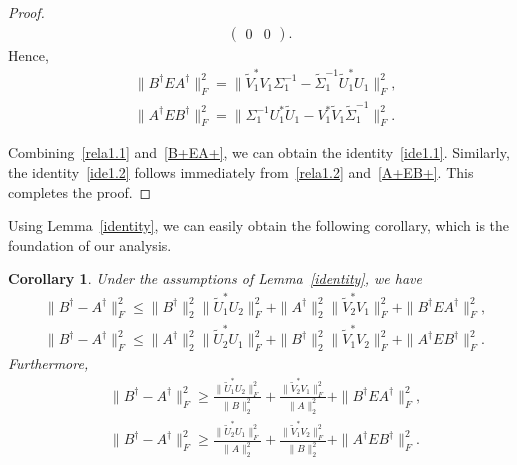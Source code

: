 \documentclass[11pt]{article}
\newtheorem{corollary}{Corollary}[section]
\begin{document}
\begin{proof}
\begin{align*}
\begin{pmatrix}
0 & 0
\end{pmatrix}.
\end{align*}
Hence,
\begin{subequations}
\begin{align}
&\|B^{\dagger}EA^{\dagger}\|_{F}^{2}=\|\widetilde{V}_{1}^{\ast}V_{1}\Sigma_{1}^{-1}-\widetilde{\Sigma}_{1}^{-1}\widetilde{U}_{1}^{\ast}U_{1}\|_{F}^{2},\label{B+EA+}\\
&\|A^{\dagger}EB^{\dagger}\|_{F}^{2}=\|\Sigma_{1}^{-1}U_{1}^{\ast}\widetilde{U}_{1}-V_{1}^{\ast}\widetilde{V}_{1}\widetilde{\Sigma}_{1}^{-1}\|_{F}^{2}.\label{A+EB+}
\end{align}
\end{subequations}

Combining~\eqref{rela1.1} and~\eqref{B+EA+}, we can obtain the identity~\eqref{ide1.1}. Similarly, the identity~\eqref{ide1.2} follows immediately from~\eqref{rela1.2} and~\eqref{A+EB+}. This completes the proof.
\end{proof}

Using Lemma~\ref{identity}, we can easily obtain the following corollary, which is the foundation of our analysis.

\begin{corollary}
Under the assumptions of Lemma~\ref{identity}, we have
\begin{subequations}
\begin{align}
&\|B^{\dagger}-A^{\dagger}\|_{F}^{2}\leq\|B^{\dagger}\|_{2}^{2}\|\widetilde{U}_{1}^{\ast}U_{2}\|_{F}^{2}+\|A^{\dagger}\|_{2}^{2}\|\widetilde{V}_{2}^{\ast}V_{1}\|_{F}^{2}+\|B^{\dagger}EA^{\dagger}\|_{F}^{2},\label{upE+1.1}\\
&\|B^{\dagger}-A^{\dagger}\|_{F}^{2}\leq\|A^{\dagger}\|_{2}^{2}\|\widetilde{U}_{2}^{\ast}U_{1}\|_{F}^{2}+\|B^{\dagger}\|_{2}^{2}\|\widetilde{V}_{1}^{\ast}V_{2}\|_{F}^{2}+\|A^{\dagger}EB^{\dagger}\|_{F}^{2}.\label{upE+1.2}
\end{align}
\end{subequations}
Furthermore,
\begin{subequations}
\begin{align}
&\|B^{\dagger}-A^{\dagger}\|_{F}^{2}\geq\frac{\|\widetilde{U}_{1}^{\ast}U_{2}\|_{F}^{2}}{\|B\|_{2}^{2}}+\frac{\|\widetilde{V}_{2}^{\ast}V_{1}\|_{F}^{2}}{\|A\|_{2}^{2}}+\|B^{\dagger}EA^{\dagger}\|_{F}^{2},\label{lowE+1.1}\\
&\|B^{\dagger}-A^{\dagger}\|_{F}^{2}\geq\frac{\|\widetilde{U}_{2}^{\ast}U_{1}\|_{F}^{2}}{\|A\|_{2}^{2}}+\frac{\|\widetilde{V}_{1}^{\ast}V_{2}\|_{F}^{2}}{\|B\|_{2}^{2}}+\|A^{\dagger}EB^{\dagger}\|_{F}^{2}.\label{lowE+1.2}
\end{align}
\end{subequations}
\end{corollary}
\end{document}
